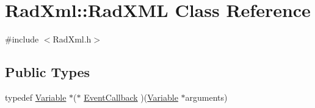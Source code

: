 \hypertarget{class_rad_xml_1_1_rad_x_m_l}{\section{Rad\-Xml\-:\-:Rad\-X\-M\-L Class Reference}
\label{class_rad_xml_1_1_rad_x_m_l}
}


{\ttfamily \#include $<$Rad\-Xml.\-h$>$}

\subsection*{Public Types}
\begin{DoxyCompactItemize}
\item 
typedef \hyperlink{class_rad_xml_1_1_variable}{Variable} $\ast$($\ast$ \hyperlink{class_rad_xml_1_1_rad_x_m_l_ab812a58a3bf015e646979a83309db244}{Event\-Callback} )(\hyperlink{class_rad_xml_1_1_variable}{Variable} $\ast$arguments)
\end{DoxyCompactItemize}

